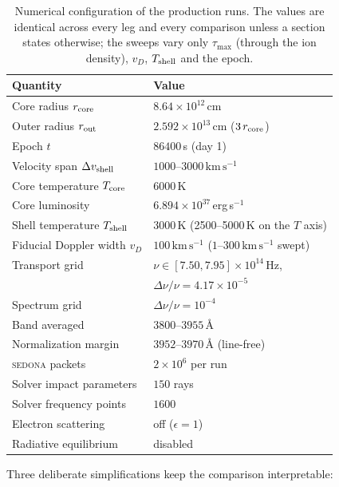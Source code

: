 \documentclass[fleqn,usenatbib]{mnras}
\newcommand{\kms}{\,\mathrm{km\,s^{-1}}}
\begin{document}
\begin{table}
\centering
\small
\caption{Numerical configuration of the production runs. The values are
identical across every leg and every comparison unless a section states
otherwise; the sweeps vary only $\tau_{\max}$ (through the ion density),
$v_D$, $T_{\rm shell}$ and the epoch.}
\label{tab:params}
\begin{tabular}{@{}ll@{}}
\toprule
Quantity & Value \\
\midrule
Core radius $r_{\rm core}$ & $8.64\times10^{12}$\,cm \\
Outer radius $r_{\rm out}$ & $2.592\times10^{13}$\,cm ($3\,r_{\rm core}$) \\
Epoch $t$ & $86400$\,s (day 1) \\
Velocity span $\Delta v_{\rm shell}$ & $1000$--$3000\kms$ \\
Core temperature $T_{\rm core}$ & $6000$\,K \\
Core luminosity & $6.894\times10^{37}$\,erg\,s$^{-1}$ \\
Shell temperature $T_{\rm shell}$ & $3000$\,K (2500--5000\,K on the $T$ axis) \\
Fiducial Doppler width $v_D$ & $100\kms$ ($1$--$300\kms$ swept) \\
Transport grid & $\nu \in [7.50,7.95]\times10^{14}$\,Hz, \\
  & $\Delta\nu/\nu = 4.17\times10^{-5}$ \\
Spectrum grid & $\Delta\nu/\nu = 10^{-4}$ \\
Band averaged & $3800$--$3955$\,\AA \\
Normalization margin & $3952$--$3970$\,\AA{} (line-free) \\
\textsc{sedona} packets & $2\times10^{6}$ per run \\
Solver impact parameters & $150$ rays \\
Solver frequency points & $1600$ \\
Electron scattering & off ($\epsilon = 1$) \\
Radiative equilibrium & disabled \\
\bottomrule
\end{tabular}
\end{table}

Three deliberate simplifications keep the comparison interpretable:
\end{document}
